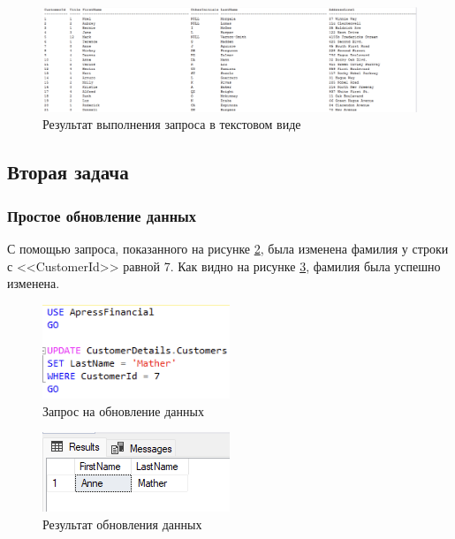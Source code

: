 \documentclass[a4paper, 14pt]{extarticle}
\begin{document}
\begin{figure}[H]
  \centering
  \includegraphics[width=\textwidth]{images/task-1/24.png}
  \caption{Результат выполнения запроса в текстовом виде}
  \label{fig:task-1-24}
\end{figure}

\subsection{Вторая задача}

\subsubsection{Простое обновление данных}

С помощью запроса, показанного на рисунке \ref{fig:task-2-1}, была изменена
фамилия у строки с <<\foreignlanguage{english}{CustomerId}>> равной 7. Как
видно на рисунке \ref{fig:task-2-2}, фамилия была успешно изменена.

\begin{figure}[H]
  \centering
  \includegraphics[width=0.5\textwidth]{images/task-2/1.png}
  \caption{Запрос на обновление данных}
  \label{fig:task-2-1}
\end{figure}

\begin{figure}[H]
  \centering
  \includegraphics[width=0.5\textwidth]{images/task-2/2.png}
  \caption{Результат обновления данных}
  \label{fig:task-2-2}
\end{figure}
\end{document}
